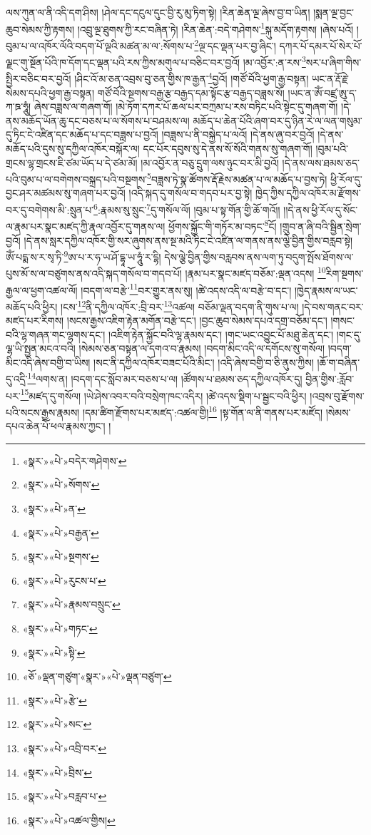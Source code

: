 ལས་ཀུན་ལ་ནི་འདི་དག་ཤིས། །ཤེལ་དང་དངུལ་དུང་བྱི་རུ་མུ་ཏིག་སྟེ། །རིན་ཆེན་ལྔ་ཞེས་བྱ་བ་ཡིན། །སྨན་ལྔ་བྱང་ཆུབ་སེམས་ཀྱི་རྟགས། །འབྲུ་ལྔ་ཐུགས་ཀྱི་རང་བཞིན་ཏེ། །རིན་ཆེན་:བདེ་གཤེགས་\footnote{«སྣར་»«པེ་»བདེར་གཤེགས་}སྐུ་མདོག་རྟགས། །ཞེས་པའོ། །བུམ་པ་ལ་འཁོར་ལོའི་བདག་པོ་ལྔའི་མཚན་མ་ལ་:སོགས་པ་\footnote{«སྣར་»«པེ་»སོགས་}ལྔ་དང་ལྡན་པར་བྱ་ཞིང་། དཀར་པོ་དམར་པོ་སེར་པོ་ལྗང་གུ་སྔོན་པོའི་ཁ་དོག་དང་ལྡན་པའི་རས་ཀྱིས་མགུལ་པ་བཅིང་བར་བྱའོ། །མ་འབྱོར་:ན་རས་\footnote{«སྣར་»«པེ་»ན་}སར་པ་ཞིག་གིས་སྤྱིར་བཅིང་བར་བྱའོ། །ཤིང་འོ་མ་ཅན་འབྲས་བུ་ཅན་གྱིས་ཁ་རྒྱན་\footnote{«སྣར་»«པེ་»བརྒྱན་}བྱའོ། །གཙོ་བོའི་ཕྱག་རྒྱ་བསྟན། ཡང་ན་རྡོ་རྗེ་སེམས་དཔའི་ཕྱག་རྒྱ་བསྟན། གཙོ་བོའི་སྔགས་བརྒྱ་རྩ་བརྒྱད་དམ་སྟོང་རྩ་བརྒྱད་བཟླས་སོ། །ཡང་ན་ཨོཾ་བཛྲ་ཨུ་ད་ཀ་ཋ་ཧཱུཾ། ཞེས་བཟླས་ལ་གཞག་གོ། །མེ་ཏོག་དཀར་པོ་ཆལ་པར་བཀྲམ་པ་རས་བཏིང་པའི་སྟེང་དུ་གཞག་གོ། །དེ་ནས་མཆོད་ཡོན་ཆུ་དང་བཅས་པ་ལ་སོགས་པ་བཤམས་ལ། མཆོད་པ་ཆེན་པོའི་ཞག་བར་དུ་ཉིན་རེ་ལ་ལན་གསུམ་དུ་ཏིང་ངེ་འཛིན་དང་མཆོད་པ་དང་བཟླས་པ་བྱའོ། །བཟླས་པ་ནི་བསྐྱེད་པ་ལའོ། །དེ་ནས་ཞུ་བར་བྱའོ། །དེ་ནས་མཆོད་པའི་དུས་སུ་དཀྱིལ་འཁོར་བསྐོར་ལ། དང་པོར་དབུས་སུ་དེ་ནས་སོ་སོའི་གནས་སུ་གཞག་གོ། །བུམ་པའི་གྲངས་ལྷ་གྲངས་ཇི་ཙམ་ཡོད་པ་དེ་ཙམ་མོ། །མ་འབྱོར་ན་བཅུ་དྲུག་ལས་ཉུང་བར་མི་བྱའོ། །དེ་ནས་ལས་ཐམས་ཅད་པའི་བུམ་པ་ལ་བགེགས་བསྐྲད་པའི་བསྔགས་\footnote{«སྣར་»«པེ་»སྔགས་}བཟླས་ཏེ་སྣ་ཚོགས་རྡོ་རྗེས་མཚན་པ་ལ་མཆོད་པ་བྱས་ཏེ། ཕྱི་རོལ་དུ་བྱང་ཤར་མཚམས་སུ་གཞག་པར་བྱའོ། །འདི་སྐད་དུ་གསོལ་བ་གདབ་པར་བྱ་སྟེ། ཁྱེད་ཀྱིས་དཀྱིལ་འཁོར་མ་རྫོགས་བར་དུ་བགེགས་མི་:སྲུན་པ་\footnote{«སྣར་»«པེ་»རུངས་པ་}:རྣམས་སུ་སྲུང་\footnote{«སྣར་»«པེ་»རྣམས་བསྲུང་}དུ་གསོལ་ལོ། །བུམ་པ་སྟ་གོན་གྱི་ཆོ་གའོ།། །།དེ་ནས་ཕྱི་རོལ་དུ་སོང་ལ་རྣམ་པར་སྣང་མཛད་ཀྱི་རྣལ་འབྱོར་དུ་གནས་ལ། ཕྱོགས་སྐྱོང་གི་གཏོར་མ་བཏང་\footnote{«སྣར་»«པེ་»གཏང་}ངོ། །གྲུབ་ན་ཞི་བའི་སྦྱིན་སྲེག་བྱའོ། །དེ་ནས་སླར་དཀྱིལ་འཁོར་གྱི་སར་ཞུགས་ནས་སྔ་མའི་ཏིང་ངེ་འཛིན་ལ་གནས་ནས་ལྕེ་བྱིན་གྱིས་བརླབ་སྟེ། ཨོཾ་པདྨ་ས་ར་སྭ་ཏི་\footnote{«སྣར་»«པེ་»སྟི་}ཨ་པ་ར་ཧ་ཡ་ཤོ་དྷཱ་ཡ་ཧཱུཾ་ར་དྷི། དེས་ལྕེ་བྱིན་གྱིས་བརླབས་ནས་ལག་ཏུ་བདུག་སྤོས་ཐོགས་ལ་པུས་མོ་ས་ལ་བཙུགས་ནས་འདི་སྐད་གསོལ་བ་གདབ་པོ། །རྣམ་པར་སྣང་མཛད་བཅོམ་:ལྡན་འདས། \footnote{«ཅོ་»ལྡན་གཙུག་«སྣར་»«པེ་»ལྡན་བཙུག་}རིག་སྔགས་རྒྱལ་ལ་ཕྱག་འཚལ་ལོ། །བདག་ལ་བརྩེ་\footnote{«སྣར་»«པེ་»རྩེ་}བར་གྱུར་ནས་སུ། །ཚེ་འདས་འདི་ལ་བརྩེ་བ་དང་། །ཁྱེད་རྣམས་ལ་ཡང་མཆོད་པའི་ཕྱིར། །ངས་\footnote{«སྣར་»«པེ་»སང་}ནི་དཀྱིལ་འཁོར་:བྲི་བར་\footnote{«སྣར་»«པེ་»འབྲི་བར་}འཚལ། བཅོམ་ལྡན་བདག་ནི་གུས་པ་ལ། །དེ་བས་གནང་བར་མཛད་པར་རིགས། །སངས་རྒྱས་འཇིག་རྟེན་མགོན་བརྩེ་དང་། །བྱང་ཆུབ་སེམས་དཔའ་དགྲ་བཅོམ་དང་། །གསང་བའི་ལྷ་གཞན་གང་ལྷགས་དང་། །འཇིག་རྟེན་སྐྱོང་བའི་ལྷ་རྣམས་དང་། །གང་ཡང་འབྱུང་པོ་མཐུ་ཆེན་དང་། །གང་དུ་ལྷ་ཡི་སྤྱན་མངའ་བའི། །སེམས་ཅན་བསྟན་ལ་དགའ་བ་རྣམས། །བདག་མིང་འདི་ལ་དགོངས་སུ་གསོལ། །བདག་མིང་འདི་ཞེས་བགྱི་བ་ཡིས། །སང་ནི་དཀྱིལ་འཁོར་བཟང་པོའི་མིང་། །འདི་ཞེས་བགྱི་བ་ཅི་ནུས་ཀྱིས། །ཆོ་ག་བཞིན་དུ་འདྲི་\footnote{«སྣར་»«པེ་»བྲིས་}ལགས་ན། །བདག་དང་སློབ་མར་བཅས་པ་ལ། །ཚོགས་པ་ཐམས་ཅད་དཀྱིལ་འཁོར་དུ། བྱིན་གྱིས་:རློབ་པར་\footnote{«སྣར་»«པེ་»བརླབ་པ་}མཛད་དུ་གསོལ། །ཡེ་ཤེས་འབར་བའི་བསྲེག་ཁང་འདིར། །ཚེ་འདས་སྡིག་པ་སྦྱང་བའི་ཕྱིར། །འབྲས་བུ་རྫོགས་པའི་སངས་རྒྱས་རྣམས། །དམ་ཚིག་རྫོགས་པར་མཛད་:འཚལ་གྱི།\footnote{«སྣར་»«པེ་»འཚལ་གྱིས།} །སྟ་གོན་ལ་ནི་གནས་པར་མཛོད། །སེམས་དཔའ་ཆེན་པོ་ཕལ་རྣམས་ཀྱང་། །
